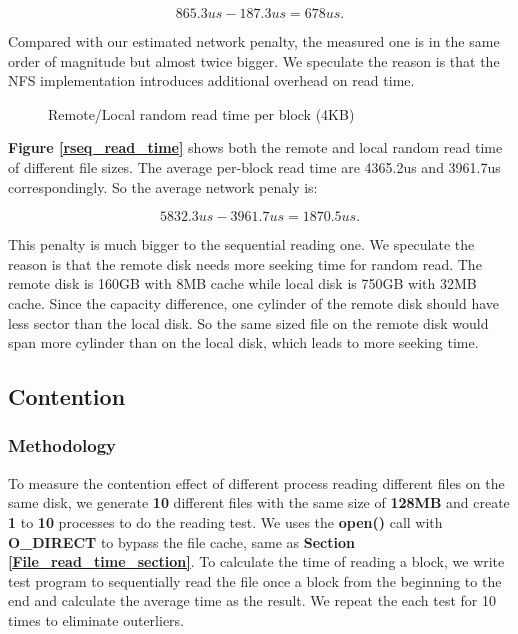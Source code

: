 $$865.3us - 187.3us = 678us.$$

Compared with our estimated network penalty, the measured one is in the same order of magnitude but almost twice bigger. We speculate the reason is that the NFS implementation introduces additional overhead on read time.

\begin{figure}[ht]
    \centering
    \caption{Remote/Local random read time per block (4KB)}
    \label{rrand_read_time}
\end{figure}

\textbf{Figure \ref{rseq_read_time}} shows both the remote and local random read time of different file sizes. The average per-block read time are 4365.2us and 3961.7us correspondingly. So the average network penaly is:

$$5832.3us - 3961.7us = 1870.5us.$$

This penalty is much bigger to the sequential reading one. We speculate the reason is that the remote disk needs more seeking time for random read. The remote disk is 160GB with 8MB cache while local disk is 750GB with 32MB cache. Since the capacity difference, one cylinder of the remote disk should have less sector than the local disk. So the same sized file on the remote disk would span more cylinder than on the local disk, which leads to more seeking time.

\subsection{Contention}
\subsubsection{Methodology}
To measure the contention effect of different process reading different files on the same disk, we generate \textbf{10} different files with the same size of \textbf{128MB} and create \textbf{1} to \textbf{10} processes to do the reading test. We uses the \textbf{open()} call with \textbf{O\_DIRECT} to bypass the file cache, same as \textbf{Section \ref{File_read_time_section}}. To calculate the time of reading a block, we write test program to sequentially read the file once a block from the beginning to the end and calculate the average time as the result. We repeat the each test for 10 times to eliminate outerliers.

